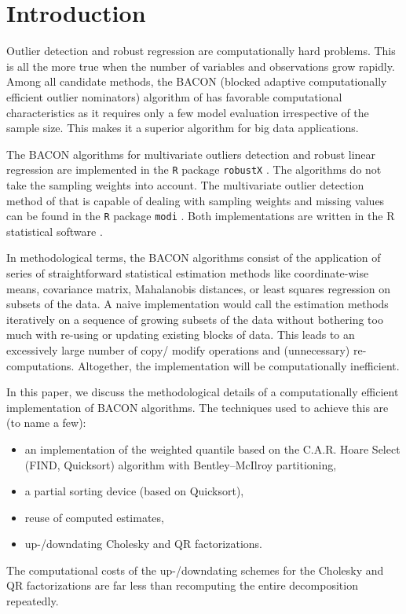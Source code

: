 \documentclass[a4paper,oneside,11pt,DIV=12]{scrartcl}
\newcommand{\code}[1]{{\texttt{#1}}}
\begin{document}
\vspace{2em}
\section{Introduction}\label{ch:introduction}
Outlier detection and robust regression are computationally hard problems.
This is all the more true when the number of variables and observations
grow rapidly. Among all candidate methods, the BACON (blocked adaptive
computationally efficient outlier nominators) algorithm of
\citet{billor_hadi_etal_2000} has favorable computational characteristics
as it requires only a few model evaluation irrespective of the sample
size. This makes it a superior algorithm for big data applications.

The BACON algorithms for multivariate outliers detection and robust
linear regression are implemented in the \code{R} package \code{robustX}
\citep{maechler_etal_2021}. The algorithms do not take the sampling
weights into account. The multivariate outlier detection method of
\citet{beguin_hulliger_2008} that is capable of dealing with sampling
weights and missing values can be found in the \code{R} package
\code{modi} \citep{hulliger_sterchi_2020}. Both implementations are written
in the R statistical software \citep{r-development-core-team_2020}.

In methodological terms, the BACON algorithms consist of the application
of series of straightforward statistical estimation methods like
coordinate-wise means, covariance matrix, Mahalanobis distances, or
least squares regression on subsets of the data. A naive implementation
would call the estimation methods iteratively on a sequence of growing
subsets of the data without bothering too much with re-using or updating
existing blocks of data. This leads to an excessively large number
of copy/ modify operations and (unnecessary) re-computations. Altogether,
the implementation will be computationally inefficient.

In this paper, we discuss the methodological details of a computationally
efficient implementation of BACON algorithms. The techniques used to
achieve this are (to name a few):
\begin{itemize}
	\item an implementation of the weighted quantile based on the C.A.R.
		Hoare Select (FIND, Quicksort) algorithm with Bentley--McIlroy
		partitioning,
	\item a partial sorting device (based on Quicksort),
	\item reuse of computed estimates,
	\item up-/downdating Cholesky and QR factorizations.
\end{itemize}
\noindent The computational costs of the up-/downdating schemes for
the Cholesky and QR factorizations are far less than recomputing the
entire decomposition repeatedly.
\end{document}
